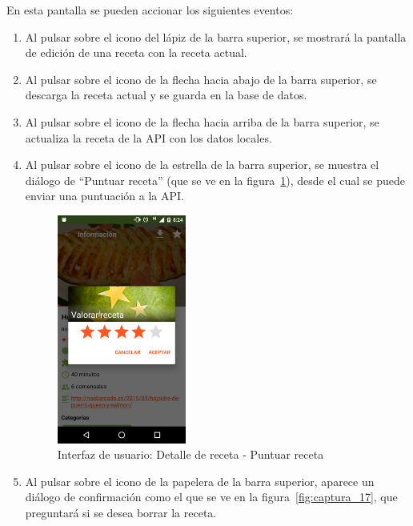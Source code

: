 En esta pantalla se pueden accionar los siguientes eventos:
\begin{enumerate}
\item Al pulsar sobre el icono del lápiz de la barra superior, se mostrará la
  pantalla de edición de una receta con la receta actual.
\item Al pulsar sobre el icono de la flecha hacia abajo de la barra superior,
  se descarga la receta actual y se guarda en la base de datos.
\item Al pulsar sobre el icono de la flecha hacia arriba de la barra superior,
  se actualiza la receta de la API con los datos locales.
\item Al pulsar sobre el icono de la estrella de la barra superior, se muestra el
  diálogo de ``Puntuar receta'' (que se ve en la figura~\ref{fig:captura_16}),
  desde el cual se puede enviar una puntuación a la API.
  
  \begin{figure}[htbp]
    \centering
    \includegraphics[width=0.4\textwidth]{cap5/img/captura_16}
    \caption{Interfaz de usuario: Detalle de receta - Puntuar receta}
    \label{fig:captura_16}
  \end{figure}

\item Al pulsar sobre el icono de la papelera de la barra superior, aparece un
  diálogo de confirmación como el que se ve en la figura~\ref{fig:captura_17},
  que preguntará si se desea borrar la receta.
  

\end{enumerate}
